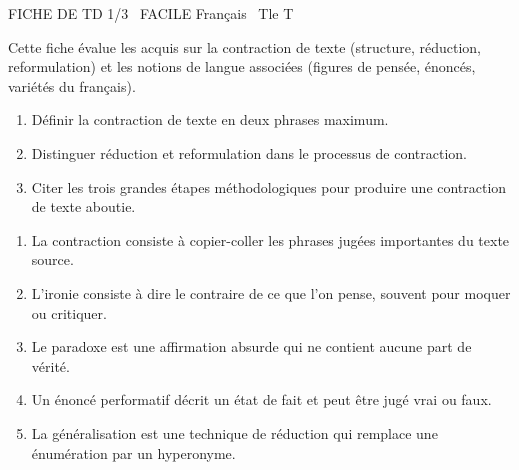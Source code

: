 \documentclass[11pt]{article}
\begin{document}
\begin{tcolorbox}[enhanced,colback=popink,colframe=popink,arc=10pt,boxrule=0pt,left=12pt,right=12pt,top=9pt,bottom=9pt]
{\color{white}\popxbold\small FICHE DE TD 1/3 \textbullet\ FACILE \hfill Français \textbullet\ Tle T\par}
\end{tcolorbox}
\vspace{4pt}
Cette fiche évalue les acquis sur la contraction de texte (structure, réduction, reformulation) et les notions de langue associées (figures de pensée, énoncés, variétés du français).

\begin{exercice}
\begin{enumerate}
    \item Définir la contraction de texte en deux phrases maximum.
    \item Distinguer \og réduction \fg{} et \og reformulation \fg{} dans le processus de contraction.
    \item Citer les trois grandes étapes méthodologiques pour produire une contraction de texte aboutie.
\end{enumerate}
\end{exercice}

\begin{exercice}
\begin{enumerate}
    \item La contraction consiste à copier-coller les phrases jugées importantes du texte source.
    \item L'ironie consiste à dire le contraire de ce que l'on pense, souvent pour moquer ou critiquer.
    \item Le paradoxe est une affirmation absurde qui ne contient aucune part de vérité.
    \item Un énoncé performatif décrit un état de fait et peut être jugé vrai ou faux.
    \item La généralisation est une technique de réduction qui remplace une énumération par un hyperonyme.
\end{enumerate}
\end{exercice}
\end{document}
